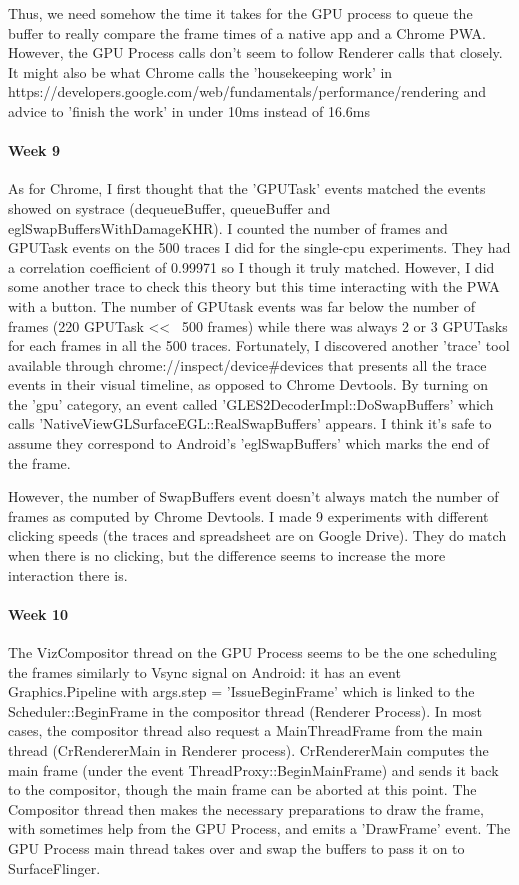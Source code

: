 \documentclass{kththesis}
\begin{document}
Thus, we need somehow the time it takes for the GPU process to queue the buffer to really compare the frame times of a native app and a Chrome PWA. However, the GPU Process calls don't seem to follow Renderer calls that closely. It might also be what Chrome calls the 'housekeeping work' in https://developers.google.com/web/fundamentals/performance/rendering and advice to 'finish the work' in under 10ms instead of 16.6ms

\paragraph{Week 9}
As for Chrome, I first thought that the 'GPUTask' events matched the events showed on systrace (dequeueBuffer, queueBuffer and eglSwapBuffersWithDamageKHR). I counted the number of frames and GPUTask events on the 500 traces I did for the single-cpu experiments. They had a correlation coefficient of 0.99971 so I though it truly matched.
However, I did some another trace to check this theory but this time interacting with the PWA with a button. The number of GPUtask events was far below the number of frames (220 GPUTask << ~500 frames) while there was always 2 or 3 GPUTasks for each frames in all the 500 traces.
Fortunately, I discovered another 'trace' tool available through chrome://inspect/device{\#}devices that presents all the trace events in their visual timeline, as opposed to Chrome Devtools. By turning on the 'gpu' category, an event called 'GLES2DecoderImpl::DoSwapBuffers' which calls 'NativeViewGLSurfaceEGL::RealSwapBuffers' appears. I think it's safe to assume they correspond to Android's 'eglSwapBuffers' which marks the end of the frame.

However, the number of SwapBuffers event doesn't always match the number of frames as computed by Chrome Devtools. I made 9 experiments with different clicking speeds (the traces and spreadsheet are on Google Drive). They do match when there is no clicking, but the difference seems to increase the more interaction there is.

\paragraph{Week 10}
The VizCompositor thread on the GPU Process seems to be the one scheduling the frames similarly to Vsync signal on Android: it has an event Graphics.Pipeline with args.step = 'IssueBeginFrame' which is linked to the Scheduler::BeginFrame in the compositor thread (Renderer Process). In most cases, the compositor thread also request a MainThreadFrame from the main thread (CrRendererMain in Renderer process). CrRendererMain computes the main frame (under the event ThreadProxy::BeginMainFrame) and sends it back to the compositor, though the main frame can be aborted at this point. The Compositor thread then makes the necessary preparations to draw the frame, with sometimes help from the GPU Process, and emits a 'DrawFrame' event. The GPU Process main thread takes over and swap the buffers to pass it on to SurfaceFlinger.
\end{document}
